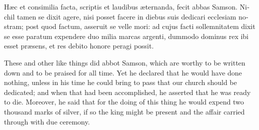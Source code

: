 \documentclass{book}
\begin{document}
\begin{paracol}{2}
\begin{otherlanguage}{latin}
H\ae{}c et consimilia facta, scriptis et laudibus \ae{}ternanda, fecit abbas Samson. Nichil tamen se dixit agere, nisi posset facere in diebus suis dedicari ecclesiam nostram; post quod factum, asseruit se velle mori: ad cujus facti sollemnitatem dixit se esse paratum expendere duo milia marcas argenti, dummodo dominus rex ibi esset pr\ae{}sens, et res debito honore peragi possit.
\end{otherlanguage}

\switchcolumn

These and other like things did abbot Samson, which are worthy to be written down and to be praised for all time. Yet he declared that he would have done nothing, unless in his time he could bring to pass that our church should be dedicated; and when that had been accomplished, he asserted that he was ready to die. Moreover, he said that for the doing of this thing he would expend two thousand marks of silver, if so the king might be present and the affair carried through with due ceremony.

\switchcolumn*


\end{paracol}
\end{document}
